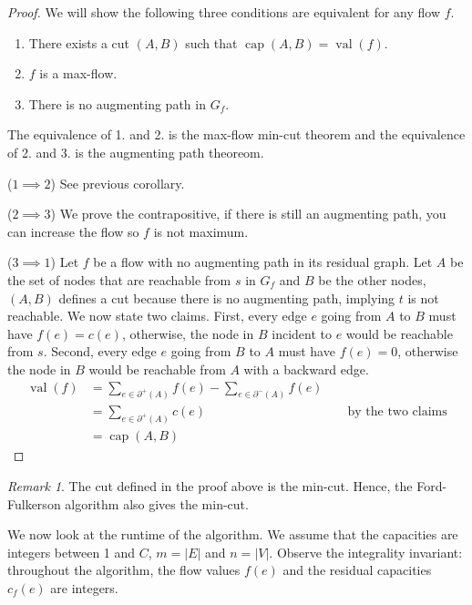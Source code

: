 \documentclass{tufte-handout}
\theoremstyle{definition}
\theoremstyle{remark}
\newtheorem{rem}[thm]{Remark}
\DeclareMathOperator{\val}{val}
\DeclareMathOperator{\capac}{cap}
\begin{document}
\begin{proof}
	We will show the following three conditions are equivalent for any flow $f$.
	\begin{enumerate}
		\item There exists a cut $(A,B)$ such that $\capac(A,B) = \val(f)$.
		\item $f$ is a max-flow.
		\item There is no augmenting path in $G_f$.
	\end{enumerate}
	The equivalence of 1. and 2. is the max-flow min-cut theorem and the equivalence of 2. and 3. is the augmenting path theoreom.
	
	($1 \implies 2$) See previous corollary.
	
	($2 \implies 3$) We prove the contrapositive, if there is still an augmenting path, you can increase the flow so $f$ is not maximum.
	
	($3 \implies 1$) Let $f$ be a flow with no augmenting path in its residual graph. Let $A$ be the set of nodes that are reachable from $s$ in $G_f$ and $B$ be the other nodes, $(A,B)$ defines a cut because there is no augmenting path, implying $t$ is not reachable. We now state two claims. First, every edge $e$ going from $A$ to $B$ must have $f(e) = c(e)$, otherwise, the node in $B$ incident to $e$ would be reachable from $s$. Second, every edge $e$ going from $B$ to $A$ must have $f(e) = 0$, otherwise the node in $B$ would be reachable from $A$ with a backward edge.
	\begin{align*}
	\val(f) &= \sum_{e \in \partial^+(A)}f(e) - \sum_{e \in \partial^-(A)}f(e)\\
	&= \sum_{e \in \partial^+(A)} c(e) &&\mbox{ by the two claims}\\
	&= \capac(A,B)
	\end{align*}
\end{proof}
\begin{rem}
	The cut defined in the proof above is the min-cut. Hence, the Ford-Fulkerson algorithm also gives the min-cut.
\end{rem}
We now look at the runtime of the algorithm. We assume that the capacities are integers between 1 and $C$, $m = |E|$ and $n = |V|$. Observe the integrality invariant: throughout the algorithm, the flow values $f(e)$ and the residual capacities $c_f(e)$ are integers.
\end{document}
